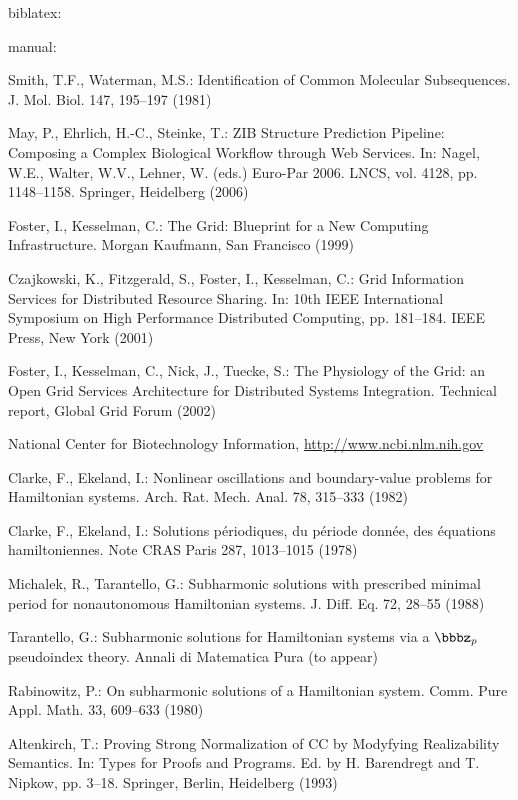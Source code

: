 \documentclass{llncs}
\begin{document}
\nocite{*} biblatex:
\printbibliography

\newpage
manual:
\begin{thebibliography}{10}
Smith, T.F., Waterman, M.S.:
Identification of Common Molecular Subsequences.
J. Mol. Biol. 147, 195--197 (1981)

May, P., Ehrlich, H.-C., Steinke, T.:
ZIB Structure Prediction Pipeline: Composing a Complex Biological Workflow through Web Services.
In: Nagel, W.E., Walter, W.V., Lehner, W. (eds.) Euro-Par 2006.
LNCS, vol. 4128, pp. 1148--1158. Springer, Heidelberg (2006)

Foster, I., Kesselman, C.:
The Grid: Blueprint for a New Computing Infrastructure.
Morgan Kaufmann, San Francisco (1999)

Czajkowski, K., Fitzgerald, S., Foster, I., Kesselman, C.:
Grid Information Services for Distributed Resource Sharing.
In: 10th IEEE International Symposium on High Performance Distributed Computing,
pp. 181--184. IEEE Press, New York (2001)

Foster, I., Kesselman, C., Nick, J., Tuecke, S.:
The Physiology of the Grid:
an Open Grid Services Architecture for Distributed Systems Integration.
Technical report, Global Grid Forum (2002)

National Center for Biotechnology Information,
\url{http://www.ncbi.nlm.nih.gov}

Clarke, F., Ekeland, I.:
Nonlinear oscillations and boundary-value problems for Hamiltonian systems.
Arch. Rat. Mech. Anal. 78, 315--333 (1982)

Clarke, F., Ekeland, I.:
Solutions p\'{e}riodiques, du p\'{e}riode donn\'{e}e, des \'{e}quations hamiltoniennes.
Note CRAS Paris 287, 1013--1015 (1978)

Michalek, R., Tarantello, G.:
Subharmonic solutions with prescribed minimal period for nonautonomous Hamiltonian systems.
J. Diff. Eq. 72, 28--55 (1988)

Tarantello, G.:
Subharmonic solutions for Hamiltonian systems via a $\bbbz_{p}$ pseudoindex theory.
Annali di Matematica Pura (to appear)

Rabinowitz, P.:
On subharmonic solutions of a Hamiltonian system.
Comm. Pure Appl. Math. 33, 609--633 (1980)

Altenkirch, T.:
Proving Strong Normalization of CC by Modyfying Realizability Semantics.
In: Types for Proofs and Programs. Ed. by H. Barendregt and T. Nipkow, pp. 3--18.
Springer, Berlin, Heidelberg (1993)
\end{thebibliography}
\end{document}
